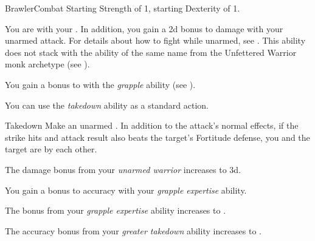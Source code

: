     \begin{feat}{Brawler}{Combat}
        \featpre Starting Strength of 1, starting Dexterity of 1.

         You are  with your .
        In addition, you gain a \plus2d bonus to damage with your unarmed attack.
        For details about how to fight while unarmed, see .
        This ability does not stack with the ability of the same name from the Unfettered Warrior monk archetype (see ).

         You gain a  bonus to  with the \textit{grapple} ability (see ).

         You can use the \textit{takedown} ability as a standard action.
        \begin{apability}{Takedown}
            Make an unarmed .
            In addition to the attack's normal effects, if the strike hits and attack result also beats the target's Fortitude defense, you and the target are \grappled by each other.
        \end{apability}

         The damage bonus from your \textit{unarmed warrior} increases to \plus3d.

         You gain a  bonus to accuracy with your \textit{grapple expertise} ability.

         The bonus from your \textit{grapple expertise} ability increases to .

         The accuracy bonus from your \textit{greater takedown} ability increases to .
    \end{feat}

